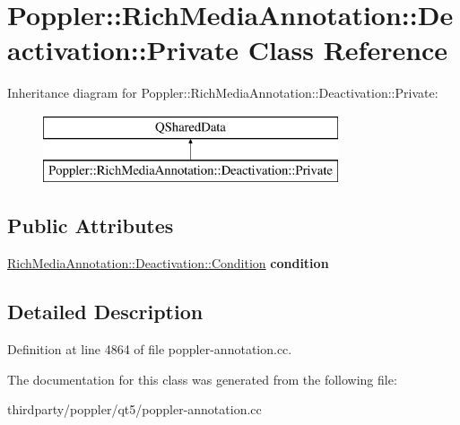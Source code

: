 \hypertarget{class_poppler_1_1_rich_media_annotation_1_1_deactivation_1_1_private}{}\section{Poppler\+:\+:Rich\+Media\+Annotation\+:\+:Deactivation\+:\+:Private Class Reference}
\label{class_poppler_1_1_rich_media_annotation_1_1_deactivation_1_1_private}
Inheritance diagram for Poppler\+:\+:Rich\+Media\+Annotation\+:\+:Deactivation\+:\+:Private\+:\begin{figure}[H]
\begin{center}
\leavevmode
\includegraphics[height=2.000000cm]{class_poppler_1_1_rich_media_annotation_1_1_deactivation_1_1_private}
\end{center}
\end{figure}
\subsection*{Public Attributes}
\begin{DoxyCompactItemize}
\item 
\mbox{\label{class_poppler_1_1_rich_media_annotation_1_1_deactivation_1_1_private_a3b22d7f63949f11d8b8f89a93c897dfc}} 
\hyperlink{class_poppler_1_1_rich_media_annotation_1_1_deactivation_a54ffabfb7c1f3ad2ea052ba6689468d3}{Rich\+Media\+Annotation\+::\+Deactivation\+::\+Condition} {\bfseries condition}
\end{DoxyCompactItemize}


\subsection{Detailed Description}


Definition at line 4864 of file poppler-\/annotation.\+cc.



The documentation for this class was generated from the following file\+:\begin{DoxyCompactItemize}
\item 
thirdparty/poppler/qt5/poppler-\/annotation.\+cc\end{DoxyCompactItemize}
